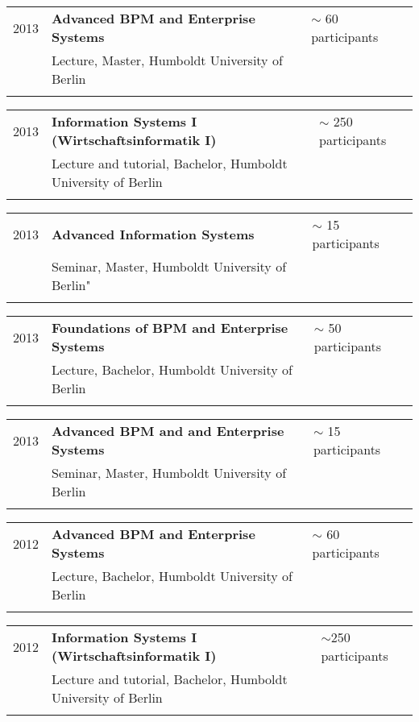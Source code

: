 \begin{tabular}{P{3cm}P{8cm}P{3cm}}		
2013		& \textbf{Advanced BPM and Enterprise Systems}			 & $\sim$ 60 participants \\
				& Lecture, Master, Humboldt University of Berlin \\
				\\
\end{tabular}
\begin{tabular}{P{3cm}P{8cm}P{3cm}}		
2013		& \textbf{Information Systems I (Wirtschaftsinformatik I)} 	 & $\sim$ 250 participants\\
				& Lecture and tutorial, Bachelor, Humboldt University of Berlin \\
				\\
\end{tabular}
\begin{tabular}{P{3cm}P{8cm}P{3cm}}		
2013		& \textbf{Advanced Information Systems	}			& $\sim$ 15 participants \\
				& Seminar, Master, Humboldt University of Berlin"\\
\\
\end{tabular}
\begin{tabular}{P{3cm}P{8cm}P{3cm}}		
2013		& \textbf{Foundations of BPM and Enterprise Systems}		  & $\sim$ 50 participants\\
				& Lecture, Bachelor, Humboldt University of Berlin\\
\\
\end{tabular}
\begin{tabular}{P{3cm}P{8cm}P{3cm}}		
2013		& \textbf{Advanced BPM and and Enterprise Systems}		& $\sim$ 15 participants\\
				& Seminar, Master, Humboldt University of Berlin\\
				\\
\end{tabular}
\begin{tabular}{P{3cm}P{8cm}P{3cm}}	
2012		& \textbf{Advanced BPM and Enterprise Systems}			 & $\sim$ 60 participants\\
				& Lecture, Bachelor, Humboldt University of Berlin\\
\\
\end{tabular}
\begin{tabular}{P{3cm}P{8cm}P{3cm}}		
2012		& \textbf{Information Systems I (Wirtschaftsinformatik I)} 	& $\sim$250 participants\\
				& Lecture and tutorial, Bachelor, Humboldt University of Berlin\\
\\
\end{tabular}
